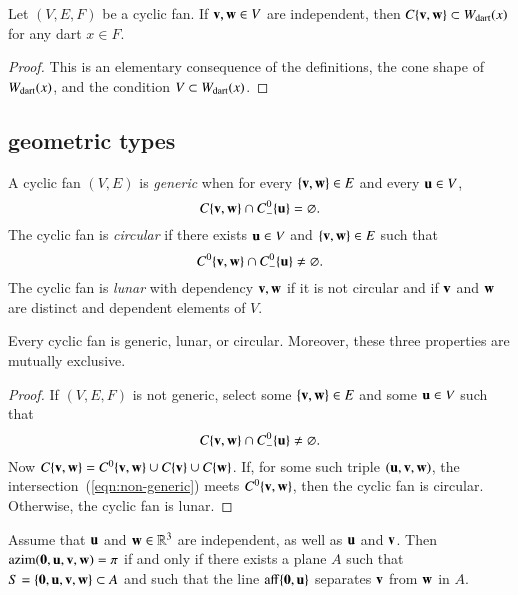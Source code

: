 \begin{lemma}  Let $(V,E,F)$ be a cyclic fan.   If ${\mathbf v},{\mathbf w}\in V$ are independent, then $C\{{\mathbf v},{\mathbf w}\} \subset W_{\text{dart}}(x)$ for any dart $x\in F$.
\end{lemma}
%

\begin{proof}  This is an elementary consequence of the definitions, the cone shape of $W_{\text{dart}}(x)$,  and the condition $V\subset W_{\text{dart}}(x)$.
\end{proof}

\subsection{geometric types}\label{sec:types}

\begin{definition}
A cyclic fan $(V,E)$ is {\it generic} when for every $\{{\mathbf v},{\mathbf w}\}\in E$
and every ${\mathbf u}\in V$, 
$$
C\{{\mathbf v},{\mathbf w}\}\cap C^0_-\{{\mathbf u}\} = \varnothing.
$$
The cyclic fan is {\it circular} if there exists ${\mathbf u}\in V$ and $\{{\mathbf v},{\mathbf w}\}\in E$ such that 
$$
C^0\{{\mathbf v},{\mathbf w}\}\cap C^0_-\{{\mathbf u}\}\ne \varnothing.
$$
The cyclic fan is {\it lunar} with dependency ${\mathbf v},{\mathbf w}$ if it is not circular and if ${\mathbf v}$ and ${\mathbf w}$ are distinct and dependent elements of $V$.
\end{definition}
%
%
%

\begin{lemma} Every cyclic fan is
generic, lunar, or circular.  Moreover, these three properties are mutually exclusive.
\end{lemma}
%
%
%
%
%

\begin{proof} If $(V,E,F)$ is not generic,  select some $\{{\mathbf v},{\mathbf w}\}\in E$
and some ${\mathbf u}\in V$ such that
\begin{equation}\label{eqn:non-generic}
C\{{\mathbf v},{\mathbf w}\}\cap C^0_-\{{\mathbf u}\} \ne \varnothing.
\end{equation}
Now $C\{{\mathbf v},{\mathbf w}\} = C^0\{{\mathbf v},{\mathbf w}\} \cup C\{{\mathbf v}\}\cup C\{{\mathbf w}\}$.  
If, for some such triple $({\mathbf u},{\mathbf v},{\mathbf w})$, the intersection~(\ref{eqn:non-generic}) meets $C^0\{{\mathbf v},{\mathbf w}\}$, then the cyclic fan is circular.  
Otherwise, the cyclic fan is lunar. 
\end{proof}

\begin{lemma}  \label{lemma:coplanar}
Assume that ${\mathbf u}$ and ${\mathbf w}\in\mathbb{R}^3$ are independent, as well as ${\mathbf u}$ and ${\mathbf v}$.  Then ${\operatorname{azim}}({\mathbf 0},{\mathbf u},{\mathbf v},{\mathbf w})=\pi$
if and only if there exists a plane $A$ such that
$S=\{{\mathbf 0},{\mathbf u},{\mathbf v},{\mathbf w}\}\subset A$ and such that the line ${\operatorname{aff}}\{{\mathbf 0},{\mathbf u}\}$ separates ${\mathbf v}$ from ${\mathbf w}$ in $A$.
\end{lemma}

